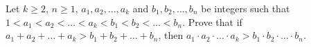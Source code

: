 Let $k\ge 2$, $n\ge 1$, $a_1, a_2,\dots, a_k$ and $b_1, b_2, \dots, b_n$ be integers such that $1<a_1<a_2<\dots <a_k<b_1<b_2<\dots <b_n$. Prove that if $a_1+a_2+\dots +a_k>b_1+b_2+\dots + b_n$, then $a_1\cdot a_2\cdot \ldots \cdot a_k>b_1\cdot b_2 \cdot \ldots \cdot b_n$.